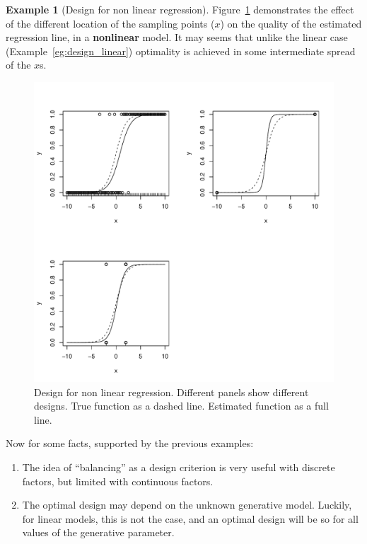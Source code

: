 \documentclass[12pt,a4paper]{report}
\theoremstyle{plain}
\theoremstyle{definition}
\newtheorem{example}{Example}
\begin{document}
\begin{example}[Design for non linear regression]
\label{eg:design_non_linear}
Figure~\ref{fig:design_nonlinear} demonstrates the effect of the different location of the sampling points ($x$) on the quality of the estimated regression line, in a \textbf{nonlinear} model.
It may seems that unlike the linear case (Example~\ref{eg:design_linear}) optimality is achieved in some intermediate spread of the $x$s.
\begin{figure}[ht]
\centering
\includegraphics[height=0.3\textheight]{art/nonlinear}
\caption[Design for Non Linear Models]{Design for non linear regression. Different panels show different designs. True function as a dashed line. Estimated function as a full line.}
\label{fig:design_nonlinear}
\end{figure}
\end{example}





Now for some facts, supported by the previous examples:
\begin{enumerate}
\item The idea of ``balancing'' as a design criterion is very useful with discrete factors, but limited with continuous factors. 
\item The optimal design may depend on the unknown generative model. Luckily, for linear models, this is not the case, and an optimal design will be so for all values of the generative parameter.
\end{enumerate}
\end{document}
